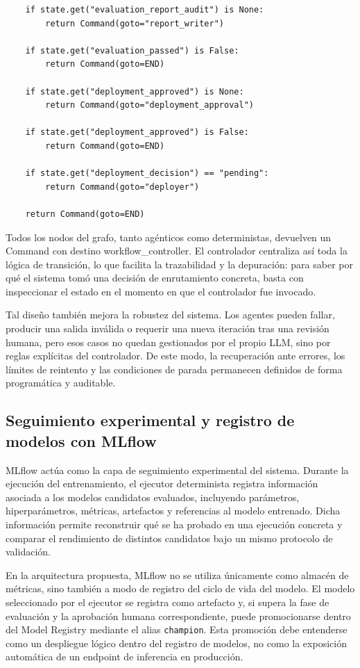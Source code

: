 \documentclass[12pt,a4paper]{article}
\theoremstyle{plain}
\begin{document}
\begin{lstlisting}
    if state.get("evaluation_report_audit") is None:
        return Command(goto="report_writer")
    
    if state.get("evaluation_passed") is False:
        return Command(goto=END)
    
    if state.get("deployment_approved") is None:
        return Command(goto="deployment_approval")
    
    if state.get("deployment_approved") is False:
        return Command(goto=END)
    
    if state.get("deployment_decision") == "pending":
        return Command(goto="deployer")
    
    return Command(goto=END)

\end{lstlisting}

Todos los nodos del grafo, tanto agénticos como deterministas, devuelven un Command con destino workflow\_controller. El controlador centraliza así toda la lógica de transición, lo que facilita la trazabilidad y la depuración: para saber por qué el sistema tomó una decisión de enrutamiento concreta, basta con inspeccionar el estado en el momento en que el controlador fue invocado.

Tal diseño también mejora la robustez del sistema. Los agentes pueden fallar, producir una salida inválida o requerir una nueva iteración tras una revisión humana, pero esos casos no quedan gestionados por el propio LLM, sino por reglas explícitas del controlador. De este modo, la recuperación ante errores, los límites de reintento y las condiciones de parada permanecen definidos de forma programática y auditable.

\subsection{Seguimiento experimental y registro de modelos con MLflow}
\label{sec:mlflow-arquitectura}

MLflow actúa como la capa de seguimiento experimental del sistema. Durante la ejecución del entrenamiento, el ejecutor determinista registra información asociada a los modelos candidatos evaluados, incluyendo parámetros, hiperparámetros, métricas, artefactos y referencias al modelo entrenado. Dicha información permite reconstruir qué se ha probado en una ejecución concreta y comparar el rendimiento de distintos candidatos bajo un mismo protocolo de validación.

En la arquitectura propuesta, MLflow no se utiliza únicamente como almacén de métricas, sino también a modo de registro del ciclo de vida del modelo. El modelo seleccionado por el ejecutor se registra como artefacto y, si supera la fase de evaluación y la aprobación humana correspondiente, puede promocionarse dentro del Model Registry mediante el alias \texttt{champion}. Esta promoción debe entenderse como un despliegue lógico dentro del registro de modelos, no como la exposición automática de un endpoint de inferencia en producción.
\end{document}
